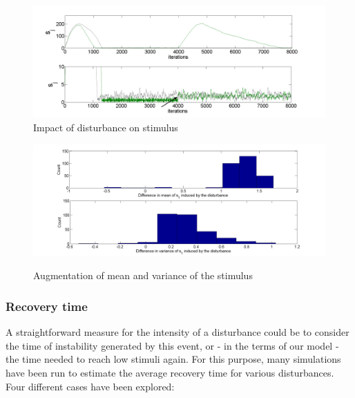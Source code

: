 \begin{figure}[ht!]
\begin{centering}
\includegraphics[scale=0.4]{figures/Figure7}\caption{Impact of disturbance on stimulus}
\label{fig:figure3}
\par\end{centering}

\centering{}
\end{figure}


\begin{figure}[ht!]
\begin{centering}
\includegraphics[scale=0.35]{figures/Augmentation2_2}
\label{fig:figure4}
\par\end{centering}

\begin{centering}
\caption{Augmentation of mean and variance of the stimulus}

\par\end{centering}

\end{figure}



\subsubsection{Recovery time}

A straightforward measure for the intensity of a disturbance could
be to consider the time of instability generated by this event, or
- in the terms of our model - the time needed to reach low stimuli
again. For this purpose, many simulations have been run to estimate
the average recovery time for various disturbances. Four different
cases have been explored:

